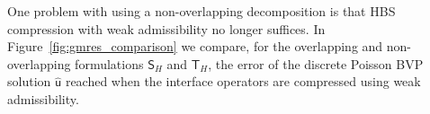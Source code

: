 \documentclass[final,onefignum,onetabnum]{siamart250211}
\newcommand{\vct}[1]{\bm{\mathsf{#1}}}
\newcommand{\mtx}[1]{\bm{\mathsf{#1}}}
\theoremstyle{definition}
\begin{document}
One problem with using a non-overlapping decomposition is that HBS compression with weak admissibility no longer suffices. In Figure~\ref{fig:gmres_comparison} we compare, for the overlapping and non-overlapping formulations $\mtx{S}_H$ and $\mtx{T}_H$, the error of the discrete Poisson BVP solution $\hat{\vct{u}}$ reached when the interface operators are compressed using weak admissibility. 

\begin{figure}
\centering
\begin{minipage}[t]{0.5\textwidth}
\centering
\vspace{0pt}
\datatableS
{}\datatableT
{}


\end{minipage}
\end{figure}
\end{document}
